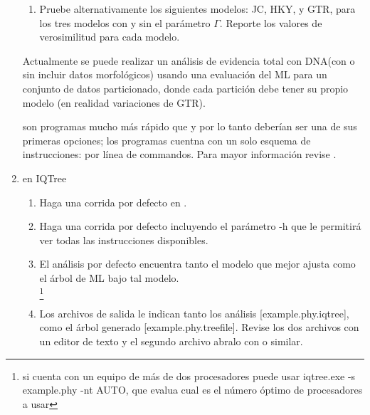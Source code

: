 \begin{enumerate}
\begin{enumerate}
		\item Pruebe alternativamente los siguientes modelos: JC, HKY, y GTR, para los tres modelos con y sin el par\'ametro $\Gamma$. Reporte los valores de verosimilitud para cada modelo.


	\end{enumerate}


  Actualmente se puede realizar un an\'alisis de evidencia total con DNA(con o
  sin incluir datos morfol\'ogicos) usando una evaluaci\'on del ML para un conjunto de datos particionado, donde cada partici\'on debe tener su propio modelo (en realidad variaciones de GTR).

   son programas mucho m\'as r\'apido que 
   y por lo tanto deber\'ian ser una de sus primeras 
  opciones; los  programas cuentna con un solo esquema de instrucciones: 
  por l\'inea de commandos. Para mayor informaci\'on revise 
  .
  
  
  \item{en IQTree}


	\begin{enumerate}
	
		\item Haga una corrida por defecto en .\\
		
		\item Haga una corrida por defecto incluyendo el par\'ametro -h que le permitir\'a ver todas las instrucciones disponibles.\\
		
		\item  El an\'alisis por defecto encuentra tanto el modelo que mejor ajusta como el \'arbol de ML bajo tal modelo.\\
		\footnote{si cuenta con un equipo de m\'as de dos procesadores puede usar  iqtree.exe -s example.phy -nt AUTO, que evalua cual es el número \'optimo de procesadores a usar }

		\item  Los archivos de salida le indican tanto los an\'alisis [example.phy.iqtree], como el \'arbol generado [example.phy.treefile]. Revise los dos archivos con un editor de texto y el segundo archivo abralo con  o similar.
		

\end{enumerate}
\end{enumerate}
